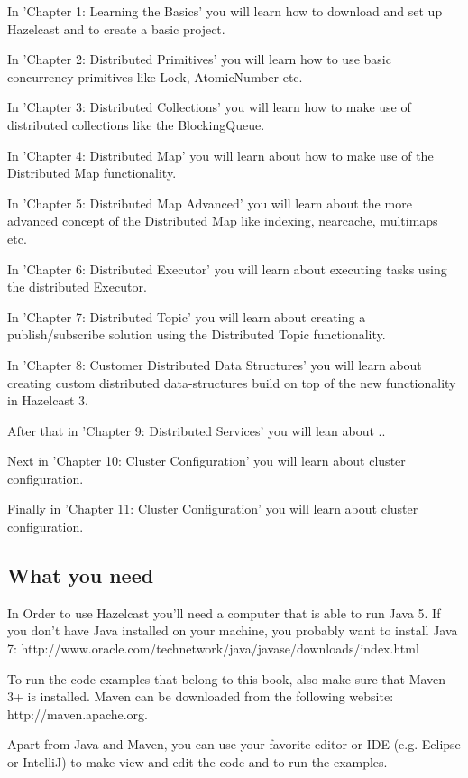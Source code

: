 In 'Chapter 1: Learning the Basics' you will learn how to download and set up Hazelcast and to create a basic project.

In 'Chapter 2: Distributed Primitives' you will learn how to use basic concurrency primitives like Lock, AtomicNumber etc.

In 'Chapter 3: Distributed Collections' you will learn how to make use of distributed collections like the BlockingQueue.

In 'Chapter 4: Distributed Map' you will learn about how to make use of the Distributed Map functionality.

In 'Chapter 5: Distributed Map Advanced' you will learn about the more advanced concept of the Distributed Map like indexing, nearcache, multimaps etc.

In 'Chapter 6: Distributed Executor' you will learn about executing tasks using the distributed Executor.

In 'Chapter 7: Distributed Topic' you will learn about creating a publish/subscribe solution using the Distributed Topic functionality.

In 'Chapter 8: Customer Distributed Data Structures' you will learn about creating custom distributed data-structures build on top of the new functionality in Hazelcast 3.

After that in  'Chapter 9: Distributed Services' you will lean about ..

Next in 'Chapter 10: Cluster Configuration' you will learn about cluster configuration.

Finally in 'Chapter 11: Cluster Configuration' you will learn about cluster configuration.

\subsection*{What you need}
In Order to use Hazelcast you'll need a computer that is able to run Java 5. If you don't have Java installed on your machine, you probably want to install Java 7: 
http://www.oracle.com/technetwork/java/javase/downloads/index.html

To run the code examples that belong to this book, also make sure that Maven 3+ is installed. Maven can be downloaded from the following website: 
http://maven.apache.org.

Apart from Java and Maven, you can use your favorite editor or IDE (e.g. Eclipse or IntelliJ) to make view and edit the code and to run the examples. 

